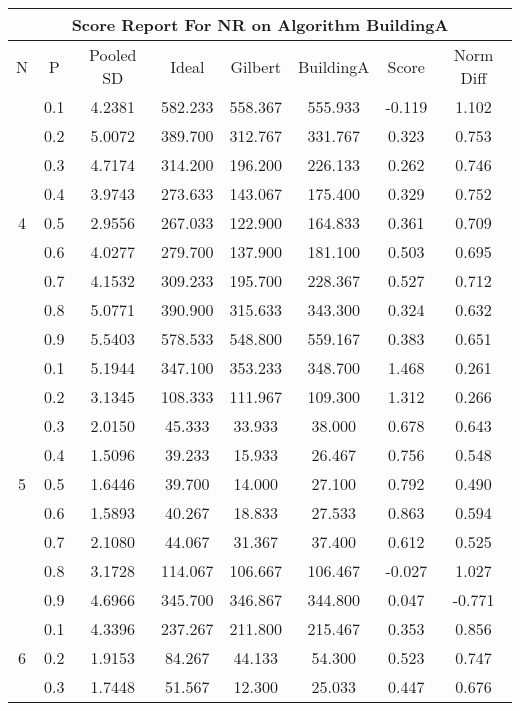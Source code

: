 \documentclass[11pt,a4paper]{report}
\begin{document}
\begin{longtable}{ | c | c || c | c | c | c | c | c | }
\hline
\multicolumn{8}{|c|}{ Score Report For NR on Algorithm BuildingA} \\
\hline
N & P & Pooled SD &  Ideal &  Gilbert & BuildingA  & Score & Norm Diff \\
 \hline
 \hline
 \endhead
\multirow{9}{*}{4} & 0.1 & 4.2381 & 582.233 & 558.367 & 555.933 & -0.119 & 1.102 \\
 & 0.2 & 5.0072 & 389.700 & 312.767 & 331.767 & 0.323 & 0.753 \\
 & 0.3 & 4.7174 & 314.200 & 196.200 & 226.133 & 0.262 & 0.746 \\
 & 0.4 & 3.9743 & 273.633 & 143.067 & 175.400 & 0.329 & 0.752 \\
 & 0.5 & 2.9556 & 267.033 & 122.900 & 164.833 & 0.361 & 0.709 \\
 & 0.6 & 4.0277 & 279.700 & 137.900 & 181.100 & 0.503 & 0.695 \\
 & 0.7 & 4.1532 & 309.233 & 195.700 & 228.367 & 0.527 & 0.712 \\
 & 0.8 & 5.0771 & 390.900 & 315.633 & 343.300 & 0.324 & 0.632 \\
 & 0.9 & 5.5403 & 578.533 & 548.800 & 559.167 & 0.383 & 0.651 \\
 \hline
\multirow{9}{*}{5} & 0.1 & 5.1944 & 347.100 & 353.233 & 348.700 & 1.468 & 0.261 \\
 & 0.2 & 3.1345 & 108.333 & 111.967 & 109.300 & 1.312 & 0.266 \\
 & 0.3 & 2.0150 & 45.333 & 33.933 & 38.000 & 0.678 & 0.643 \\
 & 0.4 & 1.5096 & 39.233 & 15.933 & 26.467 & 0.756 & 0.548 \\
 & 0.5 & 1.6446 & 39.700 & 14.000 & 27.100 & 0.792 & 0.490 \\
 & 0.6 & 1.5893 & 40.267 & 18.833 & 27.533 & 0.863 & 0.594 \\
 & 0.7 & 2.1080 & 44.067 & 31.367 & 37.400 & 0.612 & 0.525 \\
 & 0.8 & 3.1728 & 114.067 & 106.667 & 106.467 & -0.027 & 1.027 \\
 & 0.9 & 4.6966 & 345.700 & 346.867 & 344.800 & 0.047 & -0.771 \\
 \hline
\multirow{9}{*}{6} & 0.1 & 4.3396 & 237.267 & 211.800 & 215.467 & 0.353 & 0.856 \\
 & 0.2 & 1.9153 & 84.267 & 44.133 & 54.300 & 0.523 & 0.747 \\
 & 0.3 & 1.7448 & 51.567 & 12.300 & 25.033 & 0.447 & 0.676 \\

\end{longtable}
\end{document}
